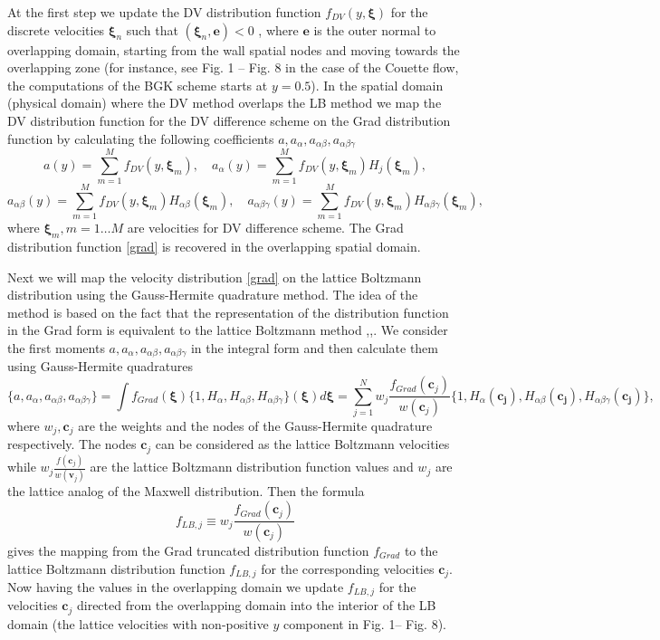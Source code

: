 \documentclass[]{elsarticle} %
\begin{document}
{At the  first  step we  update the DV distribution function $f_{DV}(y,\boldsymbol{\xi})$ for the discrete velocities  $\boldsymbol{\xi}_n$ such that $(\boldsymbol{\xi}_n,\mathbf{e})<0$ , where $\mathbf{e}$ is the outer normal to overlapping domain,  starting from the wall spatial nodes and  moving  towards the overlapping zone  (for instance, see Fig. 1 -- Fig. 8 in the case  of the Couette flow, the computations of the BGK scheme starts  at $y=0.5$).
In the spatial domain (physical domain) where  the DV method overlaps the LB method we map the DV distribution function for the DV difference scheme on the Grad distribution function by calculating the following coefficients $a, a_\alpha,a_{\alpha\beta}, a_{\alpha\beta \gamma}$
$$
a(y)=\sum_{m=1}^M  f_{DV}(y,\boldsymbol{\xi}_m),   \quad a_\alpha(y)=\sum_{m=1}^Mf_{DV}(y,\boldsymbol{\xi}_m)H_j(\boldsymbol{\xi}_m),
$$
$$
a_{\alpha\beta }(y)=\sum_{m=1}^Mf_{DV}(y,\boldsymbol{\xi}_m)H_{\alpha\beta}(\boldsymbol{\xi}_m), \quad
a_{\alpha\beta \gamma}(y)=\sum_{m=1}^Mf_{DV}(y,\boldsymbol{\xi}_m)H_{\alpha\beta \gamma}(\boldsymbol{\xi}_m),
$$
where $\boldsymbol{\xi}_m, m=1 \ldots M$ are velocities for DV  difference scheme.
The Grad  distribution function \eqref{grad} is recovered in the overlapping spatial domain.

Next we will map the velocity distribution \eqref{grad} on the lattice Boltzmann distribution using  the  Gauss-Hermite quadrature method.
The idea of the method is based on the fact  that the representation of the distribution function in the  Grad form  is equivalent to the  lattice  Boltzmann method \cite{he1997},\cite{shan1998},\cite{Shan2006}.
We  consider the first moments $a,a_{\alpha},a_{\alpha\beta}, a_{\alpha\beta \gamma}$  in the integral form and then calculate them using Gauss-Hermite quadratures
$$
\{ a,a_{\alpha},a_{\alpha\beta}, a_{\alpha\beta \gamma} \}=\int f_{Grad}(\boldsymbol{\xi})\{1,H_{\alpha}, H_{\alpha\beta} ,H_{\alpha\beta \gamma}\}(\boldsymbol{\xi})d\boldsymbol{\xi}=\sum_{j=1}^N w_j\frac{f_{Grad}(\boldsymbol{c}_j)}{w(\mathbf{c}_j)}
\{1,H_{\alpha}(\mathbf{c_j}),H_{\alpha\beta}(\mathbf{c_j}), H_{\alpha\beta\gamma}(\mathbf{c_j}) \},
$$
where $w_j, \boldsymbol{c}_j$  are the weights  and the  nodes of the Gauss-Hermite quadrature respectively. The  nodes $\mathbf{c}_j$  can be  considered as  the  lattice Boltzmann velocities while $ w_j\frac{f(\mathbf{c}_j)}{w(\mathbf{v}_j)}$ are the lattice Boltzmann distribution function values and
$w_j$ are the  lattice analog of the Maxwell distribution.  Then the  formula
\begin{equation}\label{grad_to_latt}
f_{LB,j}\equiv w_j\frac{f_{Grad}(\mathbf{c}_j)}{w(\mathbf{c}_j)}
\end{equation}
gives  the mapping from  the Grad truncated distribution function $f_{Grad}$ to the lattice Boltzmann distribution function $f_{LB,j}$ for the corresponding velocities $\mathbf{c}_j$. Now having  the values in the overlapping domain we  update  $f_{LB,j}$  for the  velocities $\mathbf{c}_j$  directed from the  overlapping domain into the interior of the LB  domain (the lattice velocities with non-positive $y$ component in Fig. 1-- Fig. 8).


}
\end{document}
